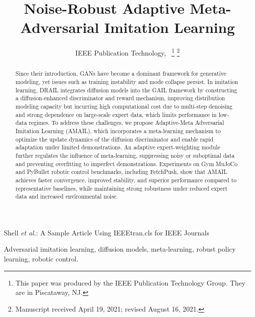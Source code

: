 \documentclass[lettersize,journal]{IEEEtran}
\begin{document}
\title{Noise-Robust Adaptive Meta-Adversarial Imitation Learning}

\author{IEEE Publication Technology,~
\thanks{This paper was produced by the IEEE Publication Technology Group. They are in Piscataway, NJ.}%
\thanks{Manuscript received April 19, 2021; revised August 16, 2021.}}

%
{Shell \MakeLowercase{\textit{et al.}}: A Sample Article Using IEEEtran.cls for IEEE Journals}


\maketitle

\begin{abstract}
Since their introduction, GANs have become a dominant framework for generative modeling, yet issues such as training instability and mode collapse persist. In imitation learning, DRAIL integrates diffusion models into the GAIL framework by constructing a diffusion-enhanced discriminator and reward mechanism, improving distribution modeling capacity but incurring high computational cost due to multi-step denoising and strong dependence on large-scale expert data, which limits performance in low-data regimes. To address these challenges, we propose Adaptive-Meta Adversarial Imitation Learning (AMAIL), which incorporates a meta-learning mechanism to optimize the update dynamics of the diffusion discriminator and enable rapid adaptation under limited demonstrations. An adaptive expert-weighting module further regulates the influence of meta-learning, suppressing noisy or suboptimal data and preventing overfitting to imperfect demonstrations. Experiments on Gym MuJoCo and PyBullet robotic control benchmarks, including FetchPush, show that AMAIL achieves faster convergence, improved stability, and superior performance compared to representative baselines, while maintaining strong robustness under reduced expert data and increased environmental noise.
\end{abstract}

\begin{IEEEkeywords}
Adversarial imitation learning, diffusion models, meta-learning, robust policy learning, robotic control.
\end{IEEEkeywords}
\end{document}
